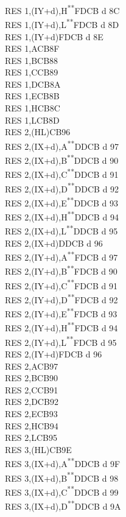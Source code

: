 \documentclass[12pt,twoside,openright,a4paper]{book}
\newcommand{\UNDOC}{\textnormal{\textsuperscript{**}}}
\begin{document}
\begin{multicols}{3}
{\begin{tabbing}
	RES 1,(IY+d),H\UNDOC\>FDCB d 8C\\
	RES 1,(IY+d),L\UNDOC\>FDCB d 8D\\
	RES 1,(IY+d)\>FDCB d 8E\\
	RES 1,A\>CB8F\\
	RES 1,B\>CB88\\
	RES 1,C\>CB89\\
	RES 1,D\>CB8A\\
	RES 1,E\>CB8B\\
	RES 1,H\>CB8C\\
	RES 1,L\>CB8D\\
	RES 2,(HL)\>CB96\\
	RES 2,(IX+d),A\UNDOC\>DDCB d 97\\
	RES 2,(IX+d),B\UNDOC\>DDCB d 90\\
	RES 2,(IX+d),C\UNDOC\>DDCB d 91\\
	RES 2,(IX+d),D\UNDOC\>DDCB d 92\\
	RES 2,(IX+d),E\UNDOC\>DDCB d 93\\
	RES 2,(IX+d),H\UNDOC\>DDCB d 94\\
	RES 2,(IX+d),L\UNDOC\>DDCB d 95\\
	RES 2,(IX+d)\>DDCB d 96\\
	RES 2,(IY+d),A\UNDOC\>FDCB d 97\\
	RES 2,(IY+d),B\UNDOC\>FDCB d 90\\
	RES 2,(IY+d),C\UNDOC\>FDCB d 91\\
	RES 2,(IY+d),D\UNDOC\>FDCB d 92\\
	RES 2,(IY+d),E\UNDOC\>FDCB d 93\\
	RES 2,(IY+d),H\UNDOC\>FDCB d 94\\
	RES 2,(IY+d),L\UNDOC\>FDCB d 95\\
	RES 2,(IY+d)\>FDCB d 96\\
	RES 2,A\>CB97\\
	RES 2,B\>CB90\\
	RES 2,C\>CB91\\
	RES 2,D\>CB92\\
	RES 2,E\>CB93\\
	RES 2,H\>CB94\\
	RES 2,L\>CB95\\
	RES 3,(HL)\>CB9E\\
	RES 3,(IX+d),A\UNDOC\>DDCB d 9F\\
	RES 3,(IX+d),B\UNDOC\>DDCB d 98\\
	RES 3,(IX+d),C\UNDOC\>DDCB d 99\\
	RES 3,(IX+d),D\UNDOC\>DDCB d 9A\\

\end{tabbing}}
\end{multicols}
\end{document}

